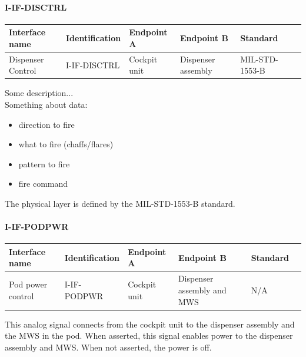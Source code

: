 \paragraph{I-IF-DISCTRL}

\begin{center}
\begin{tabular}{ | p{2cm} | l | p{2.3cm} | p{2.3cm} | l | p{1cm} |}
\hline
 \textbf{Interface name} & \textbf{Identification} & \textbf{Endpoint A} & \textbf{Endpoint B} & \textbf{Standard}\\ \hline

 Dispenser Control & I-IF-DISCTRL & Cockpit unit & Dispenser assembly & MIL-STD-1553-B\\ \hline
 
\end{tabular}
\end{center}

Some description...\\
Something about data:
\begin{itemize}
\item direction to fire
\item what to fire (chaffs/flares)
\item pattern to fire
\item fire command
\end{itemize}

The physical layer is defined by the MIL-STD-1553-B standard.

\paragraph{I-IF-PODPWR}

\begin{center}
\begin{tabular}{ | p{2cm} | l | p{2.3cm} | p{2.3cm} | l | p{1cm} |}
\hline
 \textbf{Interface name} & \textbf{Identification} & \textbf{Endpoint A} & \textbf{Endpoint B} & \textbf{Standard}\\ \hline

 Pod power control & I-IF-PODPWR & Cockpit unit & Dispenser assembly and MWS & N/A\\ \hline
 
\end{tabular}
\end{center}

This analog signal connects from the cockpit unit to the dispenser assembly and the MWS in the pod. When asserted, this signal enables power to the dispenser assembly and MWS. When not asserted, the power is off.